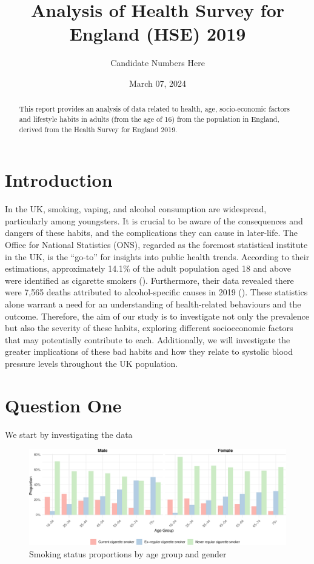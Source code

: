 \documentclass[
  11pt,
]{article}
\title{Analysis of Health Survey for England (HSE) 2019}
\author{Candidate Numbers Here}
\date{March 07, 2024}
\begin{document}
\maketitle
\begin{abstract}
This report provides an analysis of data related to health, age,
socio-economic factors and lifestyle habits in adults (from the age of
16) from the population in England, derived from the Health Survey for
England 2019.
\end{abstract}


\newpage

\section{Introduction}\label{introduction}

In the UK, smoking, vaping, and alcohol consumption are widespread,
particularly among youngsters. It is crucial to be aware of the
consequences and dangers of these habits, and the complications they can
cause in later-life. The Office for National Statistics (ONS), regarded
as the foremost statistical institute in the UK, is the ``go-to'' for
insights into public health trends. According to their estimations,
approximately 14.1\% of the adult population aged 18 and above were
identified as cigarette smokers ().
Furthermore, their data revealed there were 7,565 deaths attributed to
alcohol-specific causes in 2019 (). These
statistics alone warrant a need for an understanding of health-related
behaviours and the outcome. Therefore, the aim of our study is to
investigate not only the prevalence but also the severity of these
habits, exploring different socioeconomic factors that may potentially
contribute to each. Additionally, we will investigate the greater
implications of these bad habits and how they relate to systolic blood
pressure levels throughout the UK population.

\section{Question One}\label{question-one}

We start by investigating the data

\begin{figure}
\centering
\includegraphics{Coursework_files/figure-latex/output smoking by age plot-1.pdf}
\caption{Smoking status proportions by age group and gender}
\end{figure}
\end{document}
